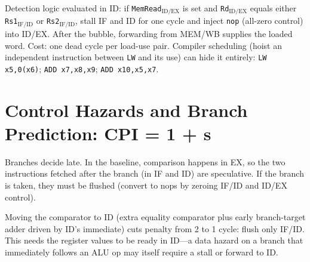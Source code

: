 \begin{center}
\end{center}

Detection logic evaluated in ID: if \texttt{MemRead$_{\text{ID/EX}}$} is set and \texttt{Rd$_{\text{ID/EX}}$} equals either \texttt{Rs1$_{\text{IF/ID}}$} or \texttt{Rs2$_{\text{IF/ID}}$}, stall IF and ID for one cycle and inject \texttt{nop} (all-zero control) into ID/EX. After the bubble, forwarding from MEM/WB supplies the loaded word. Cost: one dead cycle per load-use pair. Compiler scheduling (hoist an independent instruction between \texttt{LW} and its use) can hide it entirely: \texttt{LW x5,0(x6)}; \texttt{ADD x7,x8,x9}; \texttt{ADD x10,x5,x7}.

\section{Control Hazards and Branch Prediction: CPI = 1 + s}
Branches decide late. In the baseline, comparison happens in EX, so the two instructions fetched after the branch (in IF and ID) are speculative. If the branch is taken, they must be flushed (convert to nops by zeroing IF/ID and ID/EX control).

Moving the comparator to ID (extra equality comparator plus early branch-target adder driven by ID's immediate) cuts penalty from 2 to 1 cycle: flush only IF/ID. This needs the register values to be ready in ID---a data hazard on a branch that immediately follows an ALU op may itself require a stall or forward to ID.

